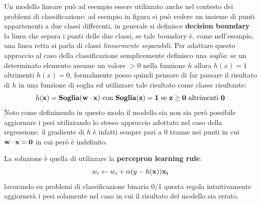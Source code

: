 \documentclass[../../main.tex]{subfiles}
\begin{document}
    Un modello lineare può ad esempio essere utilizzato anche nel contesto dei problemi di classificazione: ad esempio in figura si può vedere un insieme di punti appartenenti a due classi differenti, in generale si definisce \textbf{decision boundary} la linea che separa i punti delle due classi, se tale boundary è, come nell'esempio, una linea retta si parla di classi \textit{linearmente separabili}. Per adattare questo approccio al caso della classificazione semplicemente definisco una \textit{soglia}: se un determinato elemento assume un valore $> 0$ nella funzione $h$ allora $h(x) = 1$ altrimenti $h(x) = 0$, formalmente posso quindi pensare di far passare il risultato di $h$ in una funzione di soglia ed utilizzare tale risultato come classe risultante:
    \[h\bf(x) = Soglia(\bf{w} \cdot \bf{x}) \ \text{con} \ Soglia(z) = 1 \ \text{se} \ z \geq 0 \ \text{altrimenti} \ 0\]
    Noto come defininendo in questo modo il modello sia non sia però possibile aggiornare i pesi utilizzando lo stesso approccio adottato nel caso della regressione: il gradiente di $h$ è infatti sempre pari a 0 tranne nei punti in cui $\bf{w} \cdot \bf{x} = 0$ in cui però è indefinito.
    
    La soluzione è quella di utilizzare la \textbf{percepron learning rule}:
    \[w_i \leftarrow w_i + \alpha (y - h(\bf{x})) x_i\]
    lavorando su problemi di classificazione binaria 0/1 questa regola intuitivamente aggiornerà i pesi solamente nel caso in cui il risultato del modello sia errato.
\end{document}
